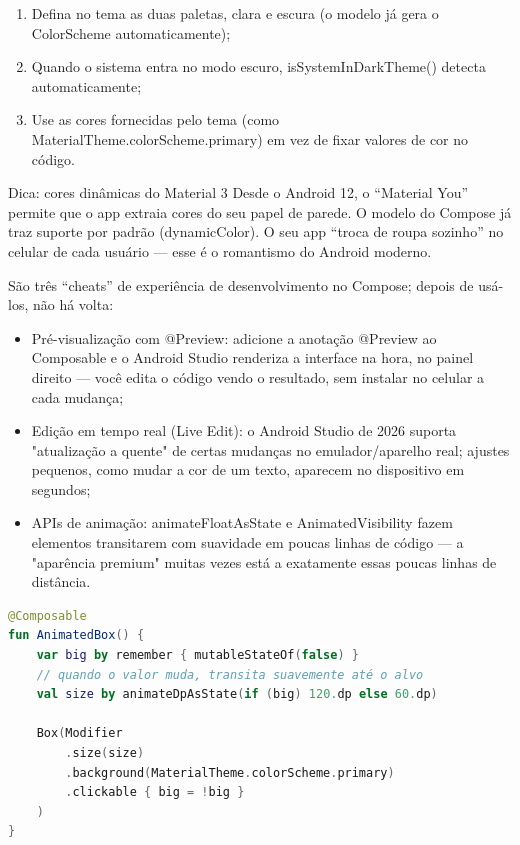 \begin{enumerate}
  \item Defina no tema as duas paletas, clara e escura (o modelo já gera o ColorScheme automaticamente);
  \item Quando o sistema entra no modo escuro, isSystemInDarkTheme() detecta automaticamente;
  \item Use as cores fornecidas pelo tema (como MaterialTheme.colorScheme.primary) em vez de fixar valores de cor no código.
\end{enumerate}

\begin{tcbinfo}{Dica: cores dinâmicas do Material 3}
Desde o Android 12, o “Material You” permite que o app extraia cores do seu papel de parede. O modelo do Compose já traz suporte por padrão (dynamicColor). O seu app “troca de roupa sozinho” no celular de cada usuário — esse é o romantismo do Android moderno.

\end{tcbinfo}


São três “cheats” de experiência de desenvolvimento no Compose; depois de usá-los, não há volta:

\begin{itemize}
  \item Pré-visualização com @Preview: adicione a anotação @Preview ao Composable e o Android Studio renderiza a interface na hora, no painel direito — você edita o código vendo o resultado, sem instalar no celular a cada mudança;
  \item Edição em tempo real (Live Edit): o Android Studio de 2026 suporta "atualização a quente" de certas mudanças no emulador/aparelho real; ajustes pequenos, como mudar a cor de um texto, aparecem no dispositivo em segundos;
  \item APIs de animação: animateFloatAsState e AnimatedVisibility fazem elementos transitarem com suavidade em poucas linhas de código — a "aparência premium" muitas vezes está a exatamente essas poucas linhas de distância.
\end{itemize}

\begin{lstlisting}[language=Kotlin]
@Composable
fun AnimatedBox() {
    var big by remember { mutableStateOf(false) }
    // quando o valor muda, transita suavemente até o alvo
    val size by animateDpAsState(if (big) 120.dp else 60.dp)

    Box(Modifier
        .size(size)
        .background(MaterialTheme.colorScheme.primary)
        .clickable { big = !big }
    )
}
\end{lstlisting}

